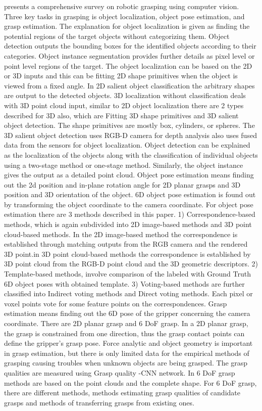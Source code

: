 {\cite{author15} presents a comprehensive survey on robotic grasping using computer vision. Three key tasks in grasping is object localization, object pose estimation, and grasp estimation. The explanation for object localization is given as finding the potential regions of the target objects without categorizing them. Object detection outputs the bounding boxes for the identified objects according to their categories. Object instance segmentation provides further details as pixel level or point level regions of the target. The object localization can be based on the 2D or 3D inputs and this can be fitting 2D shape primitives when the object is viewed from a fixed angle. In 2D salient object classification the arbitrary shapes are output to the detected objects.
3D localization without classification deals with 3D point cloud input, similar to 2D object localization there are 2 types described for 3D also, which are Fitting 3D shape primitives and 3D salient object detection. The shape primitives are mostly box, cylinders, or spheres. The 3D salient object detection uses RGB-D camera for depth analysis also uses fused data from the sensors for object localization. Object detection can be explained as the localization of the objects along with the classification of individual objects using a two-stage method or one-stage method. Similarly, the object instance gives the output as a detailed point cloud.
Object pose estimation means finding out the 2d position and in-plane rotation angle for 2D planar grasps and 3D position and 3D orientation of the object. 6D object pose estimation is found out by transforming the object coordinate to the camera coordinate.
For object pose estimation there are 3 methods described in this paper. 
1) Correspondence-based methods, which is again subdivided into  2D image-based methods and 3D point cloud-based methods. In the 2D image-based method the correspondence is established through matching outputs from the RGB camera and the rendered 3D point.in 3D point cloud-based methods the correspondence is established by 3D point cloud from the RGB-D point cloud and the 3D geometric descriptors.
2) Template-based methods, involve comparison of the labeled with Ground Truth 6D object poses with obtained template.
3) Voting-based methods are further classified into Indirect voting methods and Direct voting methods. Each pixel or voxel points vote for some feature points on the correspondences.
Grasp estimation means finding out the 6D pose of the gripper concerning the camera coordinate. There are 2D planar grasp and 6 DoF grasp. In a 2D planar grasp, the grasp is constrained from one direction, thus the grasp contact points can define the gripper's grasp pose. Force analytic and object geometry is important in grasp estimation, but there is only limited data for the empirical methods of grasping causing troubles when unknown objects are being grasped. The grasp qualities are measured using Grasp quality -CNN network. In 6 DoF grasp methods are based on the point clouds and the complete shape. For 6 DoF grasp, there are different methods, methods estimating grasp qualities of candidate grasps and methods of transferring grasps from existing ones.
}
